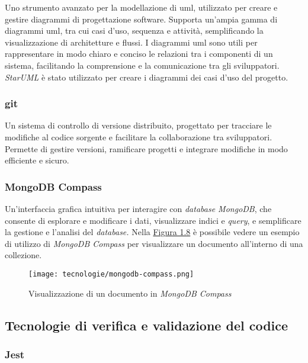 Uno strumento avanzato per la modellazione di \gls{uml}, utilizzato per creare e gestire diagrammi di progettazione software. Supporta un'ampia gamma di diagrammi \gls{uml}, tra cui casi d'uso, sequenza e attività, semplificando la visualizzazione di architetture e flussi.
I diagrammi \gls{uml} sono utili per rappresentare in modo chiaro e conciso le relazioni tra i componenti di un sistema, facilitando la comprensione e la comunicazione tra gli sviluppatori.
\textit{StarUML} è stato utilizzato per creare i diagrammi dei casi d’uso del progetto.

\pagebreak
\subsubsection{git}

Un sistema di controllo di versione distribuito, progettato per tracciare le modifiche al codice sorgente e facilitare la collaborazione tra sviluppatori. \\
Permette di gestire versioni, ramificare progetti e integrare modifiche in modo efficiente e sicuro. 

\subsubsection{MongoDB Compass}

Un'interfaccia grafica intuitiva per interagire con \textit{database MongoDB}, che consente di esplorare e modificare i dati, visualizzare indici e \textit{query},
e semplificare la gestione e l'analisi del \textit{database.}
Nella {\hyperref[fig:mongodb-compass]{Figura 1.8}} è possibile vedere un esempio di utilizzo di \textit{MongoDB Compass} per visualizzare un documento all'interno di una collezione.

\begin{figure}[H]
    \label{fig:mongodb-compass}
    \centering
    \texttt{[image: tecnologie/mongodb-compass.png]}
    \caption{Visualizzazione di un documento in \textit{MongoDB Compass}}
\end{figure}

\subsection{Tecnologie di verifica e validazione del codice}
\label{sez:tecnologie-validazione-codice}

\subsubsection{Jest}

